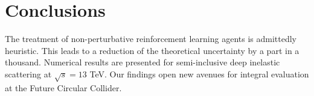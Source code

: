 \section{Conclusions}\label{sec:conclusions}

The treatment of non-perturbative reinforcement learning agents is
admittedly heuristic. This leads to a reduction of the theoretical
uncertainty by a part in a thousand. Numerical results are presented for
semi-inclusive deep inelastic scattering at $\sqrt{s} = 13$ TeV. Our
findings open new avenues for integral evaluation at the Future Circular
Collider.

